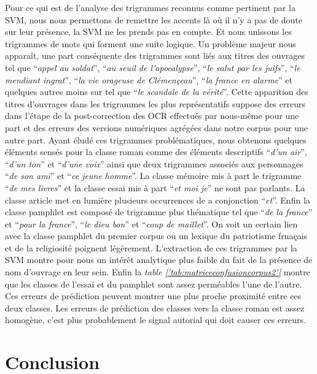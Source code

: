 Pour ce qui est de l'analyse des trigrammes reconnus comme pertinent par la SVM, nous nous permettons de remettre les accents là où il n'y a pas de doute sur leur présence, la SVM ne les prends pas en compte. Et nous unissons les trigrammes de mots qui forment une suite logique. Un problème majeur nous apparaît, une part conséquente des trigrammes sont liés aux titres des ouvrages tel que \enquote{\textit{appel au soldat}}, \enquote{\textit{au seuil de l'apocalypse}}, \enquote{\textit{le salut par les juifs}}, \enquote{\textit{le mendiant ingrat}}, \enquote{\textit{la vie orageuse de Clémençeau}}, \enquote{\textit{la france en alarme}} et quelques autres moins sur tel que \enquote{\textit{le scandale de la vérité}}. Cette apparition des titres d'ouvrages dans les trigrammes les plus représentatifs suppose des erreurs dans l'étape de la post-correction des OCR effectués par nous-même pour une part et des erreurs des versions numériques agrégées dans notre corpus pour une autre part. Ayant éludé ces trigrammes problématiques, nous obtenons quelques éléments sensés pour la classe roman  comme des éléments descriptifs \enquote{\textit{d'un air}}, \enquote{\textit{d'un ton}} et \enquote{\textit{d'une voix}} ainsi que deux trigrammes associés aux personnages \enquote{\textit{de son ami}} et \enquote{\textit{ce jeune homme}}. La classe mémoire mis à part le trigramme \enquote{\textit{de mes livres}} et la classe essai mis à part \enquote{\textit{et moi je}} ne sont pas parlants. La classe article met en lumière plusieurs occurrences de a conjonction \enquote{\textit{et}}. Enfin la classe pamphlet est composé de trigramme plus thématique tel que \enquote{\textit{de la france}} et \enquote{\textit{pour la france}}, \enquote{\textit{le dieu bon}} et \enquote{\textit{coup de maillet}}. On voit un certain lien avec la classe pamphlet du premier corpus ou un lexique du patriotisme frnaçais et de la religiosité poignent légèrement.
L'extraction de ces trigrammes par la SVM montre pour nous un intérêt analytique plus faible du fait de la présence de nom d'ouvrage en leur sein.
Enfin la \textit{table \ref{'tab:matriceconfusioncorpus2'}} montre que les classes de l'essai et du pamphlet sont assez perméables l'une de l'autre. Ces erreurs de prédiction peuvent montrer une plus proche proximité entre ces deux classes. Les erreurs de prédiction des classes vers la classe roman est assez homogène, c'est plus probablement le signal autorial qui doit causer ces erreurs.

\section{Conclusion}

